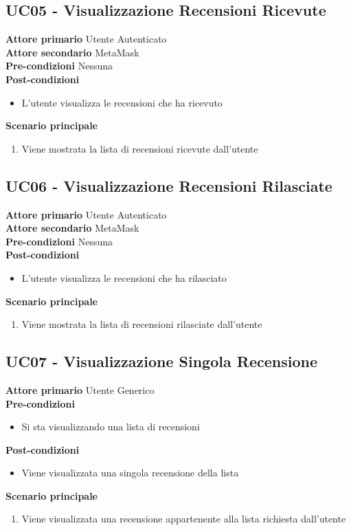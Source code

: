 \subsection{UC05 - Visualizzazione Recensioni Ricevute}
\textbf{Attore primario} Utente Autenticato \\
\textbf{Attore secondario} MetaMask \\
\textbf{Pre-condizioni} Nessuna \\
\textbf{Post-condizioni}
\begin{itemize}
    \item L'utente visualizza le recensioni che ha ricevuto
\end{itemize}
\textbf{Scenario principale}
\begin{enumerate}
    \item Viene mostrata la lista di recensioni ricevute dall'utente
\end{enumerate}

\subsection{UC06 - Visualizzazione Recensioni Rilasciate}
\textbf{Attore primario} Utente Autenticato \\
\textbf{Attore secondario} MetaMask \\
\textbf{Pre-condizioni} Nessuna \\
\textbf{Post-condizioni}
\begin{itemize}
    \item L'utente visualizza le recensioni che ha rilasciato
\end{itemize}
\textbf{Scenario principale}
\begin{enumerate}
    \item Viene mostrata la lista di recensioni rilasciate dall'utente
\end{enumerate}

\subsection{UC07 - Visualizzazione Singola Recensione}
\textbf{Attore primario} Utente Generico \\
\textbf{Pre-condizioni}
\begin{itemize}
    \item Si sta visualizzando una lista di recensioni
\end{itemize}
\textbf{Post-condizioni}
\begin{itemize}
    \item Viene visualizzata una singola recensione della lista
\end{itemize}
\textbf{Scenario principale}
\begin{enumerate}
    \item Viene visualizzata una recensione appartenente alla lista richiesta dall'utente
\end{enumerate}

